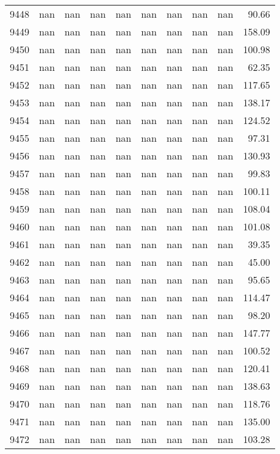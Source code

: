 \begin{tabular}{lrrrrrrrrr}
9448 & nan & nan & nan & nan & nan & nan & nan & nan & 90.66 \\
9449 & nan & nan & nan & nan & nan & nan & nan & nan & 158.09 \\
9450 & nan & nan & nan & nan & nan & nan & nan & nan & 100.98 \\
9451 & nan & nan & nan & nan & nan & nan & nan & nan & 62.35 \\
9452 & nan & nan & nan & nan & nan & nan & nan & nan & 117.65 \\
9453 & nan & nan & nan & nan & nan & nan & nan & nan & 138.17 \\
9454 & nan & nan & nan & nan & nan & nan & nan & nan & 124.52 \\
9455 & nan & nan & nan & nan & nan & nan & nan & nan & 97.31 \\
9456 & nan & nan & nan & nan & nan & nan & nan & nan & 130.93 \\
9457 & nan & nan & nan & nan & nan & nan & nan & nan & 99.83 \\
9458 & nan & nan & nan & nan & nan & nan & nan & nan & 100.11 \\
9459 & nan & nan & nan & nan & nan & nan & nan & nan & 108.04 \\
9460 & nan & nan & nan & nan & nan & nan & nan & nan & 101.08 \\
9461 & nan & nan & nan & nan & nan & nan & nan & nan & 39.35 \\
9462 & nan & nan & nan & nan & nan & nan & nan & nan & 45.00 \\
9463 & nan & nan & nan & nan & nan & nan & nan & nan & 95.65 \\
9464 & nan & nan & nan & nan & nan & nan & nan & nan & 114.47 \\
9465 & nan & nan & nan & nan & nan & nan & nan & nan & 98.20 \\
9466 & nan & nan & nan & nan & nan & nan & nan & nan & 147.77 \\
9467 & nan & nan & nan & nan & nan & nan & nan & nan & 100.52 \\
9468 & nan & nan & nan & nan & nan & nan & nan & nan & 120.41 \\
9469 & nan & nan & nan & nan & nan & nan & nan & nan & 138.63 \\
9470 & nan & nan & nan & nan & nan & nan & nan & nan & 118.76 \\
9471 & nan & nan & nan & nan & nan & nan & nan & nan & 135.00 \\
9472 & nan & nan & nan & nan & nan & nan & nan & nan & 103.28 \\

\end{tabular}
